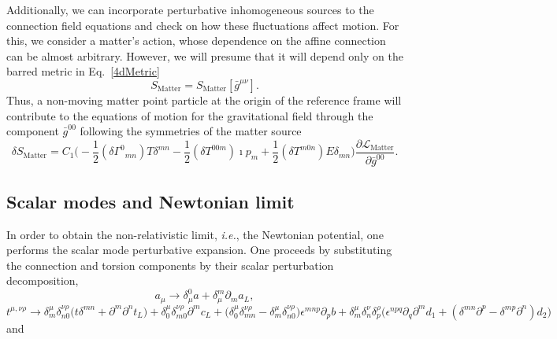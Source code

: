 \documentclass[twocolumn,aps,
  showpacs,showkeys,prd,superscriptaddress]{revtex4-1}
\begin{document}
Additionally, we can incorporate perturbative inhomogeneous sources to the connection field equations and check on how these fluctuations affect motion. For this, we consider a matter's action, whose dependence on the affine connection can be almost arbitrary. However, we will presume that it will depend only on the barred metric in Eq.~\eqref{4dMetric}
$$ S_{\text{Matter}} = {S}_{\text{Matter}}[\bar{g}^{\mu\nu}].$$
Thus, a non-moving matter point particle at the origin of the reference frame will contribute to the equations of motion for the gravitational field through the component $\bar{g}^{00}$ following the symmetries of the matter source 
\begin{dmath}
  \label{mattervariation}
  \delta {S}_{\text{Matter}} =  C_1 \Big(- \frac{1}{2} ({\delta\Gamma}^{0}{}_{m n})  T {\delta}^{m n} - \frac{1}{2}  ({\delta T}^{0 0 m})  \imath {p}_{m} + \frac{1}{2}  ({\delta T}^{m 0 n})  E {\delta}_{m n} \Big)\frac{\partial\mathcal{L}_{\text{Matter}}}{\partial \bar{g}^{00}}.
\end{dmath}


\subsection*{Scalar modes  and Newtonian limit}

In order to obtain the non-relativistic limit, \emph{i.e.}, the Newtonian potential, one performs the scalar mode perturbative expansion. One proceeds by substituting the connection and torsion components by their scalar perturbation decomposition,
\begin{equation}
  a_\mu \to \delta_\mu^0 a+\delta_\mu^m \partial_{m}a_L,
\end{equation}
\mbox{}
\begin{dmath}
  t^{\mu,\nu\rho} \to \delta^{\mu}_m\delta^{\nu\rho}_{n0} \Big(t \delta^{m n} + \partial^m \partial^n t_L \Big)
  +\delta^{\mu}_0 \delta^{\nu\rho}_{m0} \partial^m c_L
  + \Big(\delta^{\mu}_0\delta^{\nu\rho}_{mn}-\delta^{\mu}_m\delta^{\nu\rho}_{n0}\Big)\epsilon^{m n p} \partial_{p} b
  +\delta^{\mu}_m \delta^{\nu}_{n} \delta^{\rho}_{p} \Big(\epsilon^{n p q}\partial_q \partial^m d_1 +  (\delta^{m n} \partial^p - \delta^{m p} \partial^n)d_2\Big)
\end{dmath}
and
\end{document}
